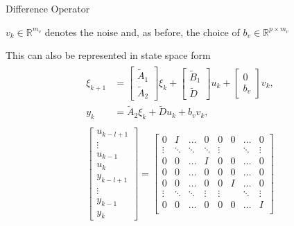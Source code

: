\documentclass[aspectratio=169, handout, 10pt, hyperref=colorlinks]{beamer}
\begin{document}
\begin{frame}[allowframebreaks]{Difference Operator}
\begin{prop}[\cite{9551767}]
        $v_k \in \mathbb{R}^{m_v}$ denotes the noise and, as before,  the choice of $b_v \in \mathbb{R}^{p \times m_v}$ 
    \end{prop}
        This can also be represented in state space form
        \begin{align}
        \begin{split}
        \label{eq:extended_sys2}
        \xi_{k+1} &= 
        \begin{bmatrix} 
        \widetilde{A}_1 \\
        \widetilde{A}_2 \end{bmatrix} 
        \xi_k + \begin{bmatrix} \widetilde{B}_1 \\ \widetilde{D} \end{bmatrix} u_{k} + \begin{bmatrix} 0 \\  b_v \end{bmatrix} v_{k}, \\
        y_k &= \widetilde{A}_2 \xi_k + \widetilde{D} u_k + b_v v_{k},
        \end{split} 
        \end{align}
        \begin{align}
        \begin{split}
        \label{eq:extended_sys_bw}
        \begin{bmatrix} u_{k-l+1} \\ \vdots \\ u_{k-1} \\ u_{k} \\ y_{k-l+1} \\ \vdots \\ y_{k-1} \\ y_{k} \end{bmatrix} = \begin{bmatrix} 
        0 & I & \dots & 0 & 0 & 0 & \dots & 0  \\
        \vdots & \ddots & \ddots&\ddots& \vdots & & \ddots&\vdots \\
        0 & 0 & \dots & I & 0& 0&  \dots & 0 \\
        0 & 0 & \dots & 0 & 0 & 0&  \dots & 0 \\
        0 & 0 & \dots & 0 & 0& I& \dots &0 \\
        \vdots & \ddots & \ddots&\vdots&\vdots & & \ddots&\vdots \\
        0 & 0 & \dots & 0 & 0& 0&  \dots & I \\

\end{bmatrix}
\end{split}
\end{align}
\end{frame}
\end{document}
